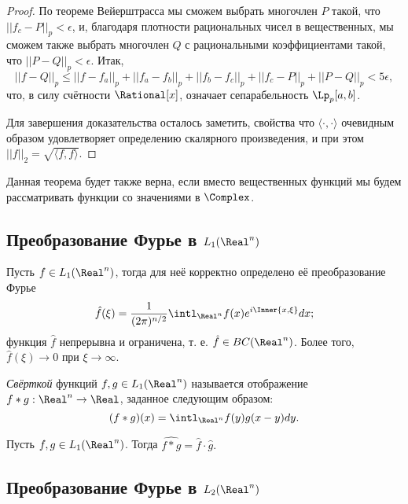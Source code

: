 \documentclass[main]{subfiles}
\begin{document}
\begin{proof}
  По теореме Вейерштрасса мы сможем
  выбрать многочлен \( P \) такой,
  что \( ||f_c - P||_p < \epsilon \),
  и, благодаря плотности рациональных чисел
  в вещественных, мы сможем также выбрать
  многочлен \( Q \) с рациональными коэффициентами
  такой, что \( ||P - Q||_p < \epsilon \).
  Итак,
  \[
    ||f - Q||_p \le ||f - f_a||_p + ||f_a - f_b||_p
    + ||f_b - f_c||_p + ||f_c - P||_p + ||P - Q||_p <
    5 \epsilon,
  \]
  что, в силу счётности \( \Rational[x] \),
  означает сепарабельность \( \Lp_p[a, b] \).

  Для завершения доказательства осталось заметить,
  свойства
  что \( \langle \cdot, \cdot \rangle \) очевидным
  образом удовлетворяет определению скалярного
  произведения, и при этом
  \( ||f||_2 = \sqrt{\langle f, f \rangle} \).
\end{proof}

\begin{remark}
  Данная теорема будет также верна,
  если вместо вещественных функций
  мы будем рассматривать функции
  со значениями в \( \Complex \).
\end{remark}

\subsection{Преобразование Фурье в \( L_1(\Real^n) \)}

\begin{theorem*}
  Пусть \( f \in L_1(\Real^n) \),
  тогда для неё корректно определено
  её преобразование Фурье
  \[
    \hat f (\xi) = \frac1{(2 \pi)^{n/2}} \intl_{\Real^n} f(x) e^{i\Inner{x, \xi}} dx;
  \]
  функция \( \hat f \)
  непрерывна и ограничена,
  т. е. \( \hat f \in BC(\Real^n) \).
  Более того, \( \hat f(\xi) \to 0 \)  при \( \xi \to \infty \).
\end{theorem*}

\begin{definition}
  \emph{Свёрткой} функций \( f, g \in L_1(\Real^n) \)
  называется отображение \( f * g : \Real^n \to \Real \),
  заданное следующим образом:
  \[
    (f * g)(x) = \intl_{\Real^n} f(y) g(x - y) dy.
  \]
\end{definition}

\begin{theorem*}
  Пусть \( f, g \in L_1(\Real^n) \).
  Тогда
  \( \widehat{f * g} = \hat f \cdot \hat g. \)
\end{theorem*}

\subsection{Преобразование Фурье в \( L_2(\Real^n) \)}
\end{document}
